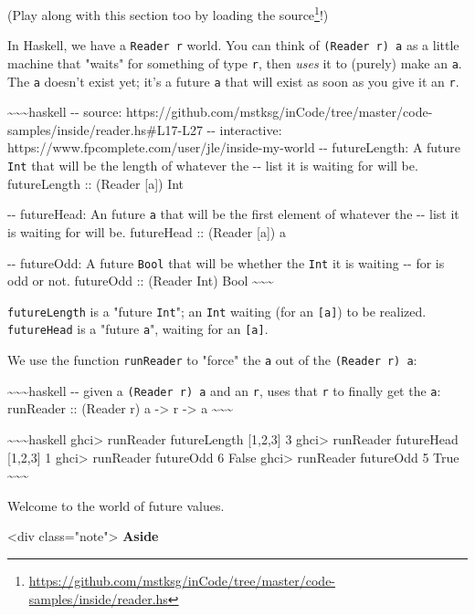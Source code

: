 \documentclass[]{article}
\renewcommand{\href}[2]{#2\footnote{\url{#1}}}
\begin{document}
(Play along with this section too by
\href{https://github.com/mstksg/inCode/tree/master/code-samples/inside/reader.hs}{loading
the source}!)

In Haskell, we have a \texttt{Reader\ r} world. You can think of
\texttt{(Reader\ r)\ a} as a little machine that "waits" for something of type
\texttt{r}, then \emph{uses} it to (purely) make an \texttt{a}. The \texttt{a}
doesn't exist yet; it's a future \texttt{a} that will exist as soon as you give
it an \texttt{r}.

\textasciitilde{}\textasciitilde{}\textasciitilde{}haskell -\/- source:
https://github.com/mstksg/inCode/tree/master/code-samples/inside/reader.hs\#L17-L27
-\/- interactive: https://www.fpcomplete.com/user/jle/inside-my-world -\/-
futureLength: A future \texttt{Int} that will be the length of whatever the -\/-
list it is waiting for will be. futureLength :: (Reader {[}a{]}) Int

-\/- futureHead: An future \texttt{a} that will be the first element of whatever
the -\/- list it is waiting for will be. futureHead :: (Reader {[}a{]}) a

-\/- futureOdd: A future \texttt{Bool} that will be whether the \texttt{Int} it
is waiting -\/- for is odd or not. futureOdd :: (Reader Int) Bool
\textasciitilde{}\textasciitilde{}\textasciitilde{}

\texttt{futureLength} is a "future \texttt{Int}"; an \texttt{Int} waiting (for
an \texttt{{[}a{]}}) to be realized. \texttt{futureHead} is a "future
\texttt{a}", waiting for an \texttt{{[}a{]}}.

We use the function \texttt{runReader} to "force" the \texttt{a} out of the
\texttt{(Reader\ r)\ a}:

\textasciitilde{}\textasciitilde{}\textasciitilde{}haskell -\/- given a
\texttt{(Reader\ r)\ a} and an \texttt{r}, uses that \texttt{r} to finally get
the \texttt{a}: runReader :: (Reader r) a -\textgreater{} r -\textgreater{} a
\textasciitilde{}\textasciitilde{}\textasciitilde{}

\textasciitilde{}\textasciitilde{}\textasciitilde{}haskell ghci\textgreater{}
runReader futureLength {[}1,2,3{]} 3 ghci\textgreater{} runReader futureHead
{[}1,2,3{]} 1 ghci\textgreater{} runReader futureOdd 6 False ghci\textgreater{}
runReader futureOdd 5 True \textasciitilde{}\textasciitilde{}\textasciitilde{}

Welcome to the world of future values.

\textless{}div class="note"\textgreater{} \textbf{Aside}
\end{document}
